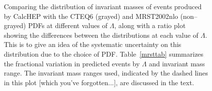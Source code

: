 \begin{figure}[htp]
\begin{minipage}[b]{.69\textwidth}
\begin{infilsf}\tiny

\end{infilsf}
\end{minipage}
\begin{minipage}[b]{.3\textwidth}
\caption{Comparing the distribution of invariant masses of events produced by CalcHEP with the CTEQ6 (grayed) and MRST2002nlo (non--grayed) PDFs at different values of $\Lambda$, along with a ratio plot showing the differences between the distributions at each value of $\Lambda$. This is to give an idea of the systematic uncertainty on this distribution due to the choice of PDF. Table~\ref{mrsttab} summarizes the fractional variation in predicted events by $\Lambda$ and invariant mass range. The invariant mass ranges used, indicated by the dashed lines in this plot [which you've forgotten...], are discussed in the text. \label{mrst}}
\end{minipage}
\end{figure}
